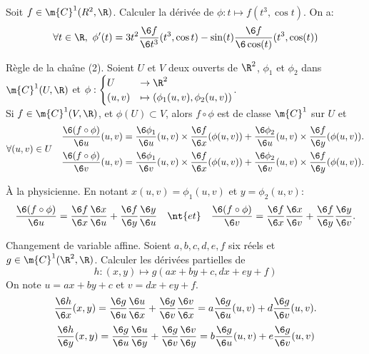 \documentclass[11pt]{article}
\renewcommand*{\C}{\m{C}}
\begin{document}
\begin{ex}{}{}
    Soit $f\in\C^1(R^2,\R)$. Calculer la dérivée de $\phi:t\mapsto f(t^3,\cos t)$.
    \tcblower
    On a:
    \begin{equation*}
        \forall t \in \R, ~ \phi'(t)=3t^2\frac{\6 f}{\6 t^3}(t^3,\cos t)-\sin(t)\frac{\6 f}{\6 \cos(t)}(t^3,\cos(t))
    \end{equation*}
\end{ex}

\begin{thm}{Règle de la chaîne (2).}{}
    Soient $U$ et $V$ deux ouverts de $\R^2$, $\phi_1$ et $\phi_2$ dans $\C^1(U,\R)$ et $\phi:\begin{cases}U&\to\R^2\\(u,v)&\mapsto (\phi_1(u,v), \phi_2(u,v))\end{cases}$.\\
    Si $f\in\C^1(V,\R)$, et $\phi(U)\subset V$, alors $f\circ\phi$ est de classe $\C^1$ sur $U$ et
    \begin{equation*}
        \forall (u,v) \in U\quad \begin{aligned}
            \frac{\6 (f\circ \phi)}{\6 u}(u,v)=\frac{\6 \phi_1}{\6 u}(u,v)\times \frac{\6 f}{\6 x}(\phi(u,v))+\frac{\6 \phi_2}{\6 u}(u,v)\times\frac{\6 f}{\6 y}(\phi(u,v)).\\
            \frac{\6(f\circ \phi)}{\6 v}(u,v)=\frac{\6 \phi_1}{\6 v}(u,v)\times \frac{\6 f}{\6 x}(\phi(u,v)) + \frac{\6 \phi_2}{\6 v}(u,v)\times\frac{\6 f}{\6 y}(\phi(u,v)).
        \end{aligned}
    \end{equation*}
\end{thm}

\begin{meth}{À la physicienne.}{}
    En notant $x(u,v)=\phi_1(u,v)$ et $y=\phi_2(u,v)$:
    \begin{equation*}
        \frac{\6(f \circ \phi)}{\6 u}=\frac{\6 f}{\6 x}\frac{\6 x}{\6 u}+\frac{\6 f}{\6 y}\frac{\6 y}{\6 u} \quad \nt{et} \quad \frac{\6(f\circ\phi)}{\6 v}=\frac{\6 f}{\6 x}\frac{\6 x}{\6 v} + \frac{\6 f}{\6 y}\frac{\6 y}{\6 v}.
    \end{equation*}
\end{meth}

\begin{ex}{Changement de variable affine.}{}
    Soient $a,b,c,d,e,f$ six réels et $g\in\C^1(\R^2,\R)$. Calculer les dérivées partielles de
    \begin{equation*}
        h:(x,y)\mapsto g(ax+by+c, dx+ey+f)
    \end{equation*}
    \tcblower
    On note $u=ax+by+c$ et $v=dx+ey+f$.
    \begin{equation*}
        \frac{\6 h}{\6 x}(x,y)=\frac{\6 g}{\6 u}\frac{\6 u}{\6 x}+\frac{\6 g}{\6 v}\frac{\6 v}{\6 x}=a\frac{\6 g}{\6 u}(u,v)+d\frac{\6 g}{\6 v}(u,v).
    \end{equation*}
    \begin{equation*}
        \frac{\6 h}{\6 y}(x,y)=\frac{\6 g}{\6 u}\frac{\6 u}{\6 y}+\frac{\6 g}{\6 v}\frac{\6 v}{\6 y}=b\frac{\6 g}{\6 u}(u,v)+e\frac{\6 g}{\6 v}(u,v)
    \end{equation*}
\end{ex}
\end{document}
